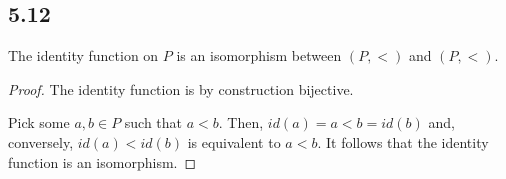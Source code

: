 \subsection*{5.12} The identity function on $P$ is an isomorphism between $(P, <)$ and $(P, <)$.

\begin{proof}
The identity function is by construction bijective.

Pick some $a,b \in P$ such that $a < b$. Then, $id(a) = a < b = id(b)$ and, conversely, $id(a) < id(b)$ is equivalent to $a < b$. It follows that the identity function is an isomorphism.
\end{proof}

\newpage

